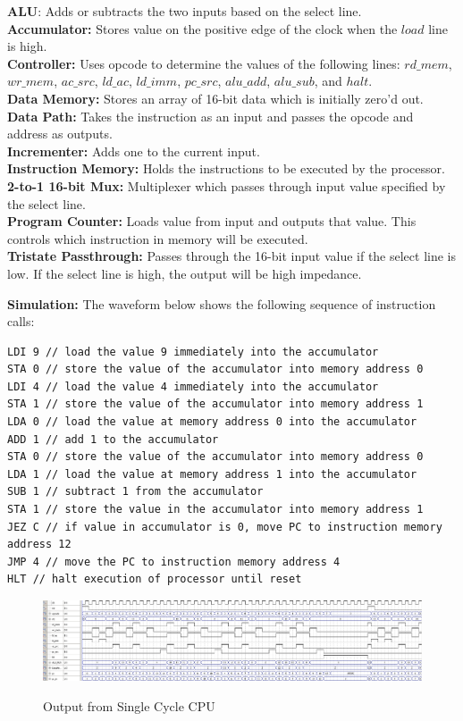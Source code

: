 \documentclass{article}         %
\begin{document}
\textbf{ALU}: Adds or subtracts the two inputs based on the select line.\\
\textbf{Accumulator:} Stores value on the positive edge of the clock when the $load$ line is high.\\
\textbf{Controller:} Uses opcode to determine the values of the following lines: $rd\_mem$, $wr\_mem$, $ac\_src$, $ld\_ac$, $ld\_imm$, $pc\_src$, $alu\_add$, $alu\_sub$, and $halt$.\\
\textbf{Data Memory:} Stores an array of 16-bit data which is initially zero'd out.\\
\textbf{Data Path:} Takes the instruction as an input and passes the opcode and address as outputs.\\
\textbf{Incrementer:} Adds one to the current input.\\
\textbf{Instruction Memory:} Holds the instructions to be executed by the processor.\\
\textbf{2-to-1 16-bit Mux:} Multiplexer which passes through input value specified by the select line.\\
\textbf{Program Counter:} Loads value from input and outputs that value. This controls which instruction in memory will be executed.\\
\textbf{Tristate Passthrough:} Passes through the 16-bit input value if the select line is low. If the select line is high, the output will be high impedance.\\

\newpage

\textbf{Simulation:} The waveform below shows the following sequence of instruction calls:
\begin{verbatim}
LDI 9 // load the value 9 immediately into the accumulator
STA 0 // store the value of the accumulator into memory address 0
LDI 4 // load the value 4 immediately into the accumulator
STA 1 // store the value of the accumulator into memory address 1
LDA 0 // load the value at memory address 0 into the accumulator
ADD 1 // add 1 to the accumulator
STA 0 // store the value of the accumulator into memory address 0
LDA 1 // load the value at memory address 1 into the accumulator
SUB 1 // subtract 1 from the accumulator
STA 1 // store the value in the accumulator into memory address 1
JEZ C // if value in accumulator is 0, move PC to instruction memory address 12
JMP 4 // move the PC to instruction memory address 4
HLT // halt execution of processor until reset
\end{verbatim}

\begin{figure}[H]
\begin{center}
\includegraphics[scale=0.25]{waveform.png}\\
\end{center}
\caption{Output from Single Cycle CPU}
\end{figure}
\end{document}
